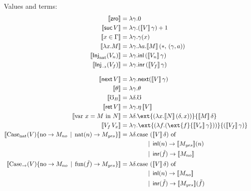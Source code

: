
\noindent Values and terms:
\begin{align*}
  \sem{\zro}         &= \lambda \gamma . 0 \\
  \sem{\suc\, V}     &= \lambda \gamma . (\sem{V}\, \gamma) + 1 \\
  \sem{x \in \Gamma} &= \lambda \gamma . \gamma(x) \\
  \sem{\lda{x}{M}}   &= \lambda \gamma . \lambda a . \sem{M}\, (*,\, (\gamma , a))  \\
  \sem{\injnat{V_n}} &= \lambda \gamma . \inl\, (\sem{V_n}\, \gamma) \\
  \sem{\injarr{V_f}} &= \lambda \gamma . \inr\, (\sem{V_f}\, \gamma) \\[2ex]
  \sem{\nxt\, V}     &= \lambda \gamma . \nxt (\sem{V}\, \gamma) \\
  \sem{\theta}       &= \lambda \gamma . \theta \\
%
  \sem{\err_B}         &= \lambda \delta . \mho \\
  \sem{\ret\, V}       &= \lambda \gamma . \eta\, \sem{V} \\
  \sem{\bind{x}{M}{N}} &= \lambda \delta . \ext {(\lambda x . \sem{N}\, (\delta, x))} {\sem{M}\, \delta} \\
  \sem{V_f\, V_x}      &= \lambda \gamma . \ext {(\lambda f . (\ext {f} {\sem{V_x}\, \gamma}))} {(\sem{V_f}\, \gamma)} \\
  \sem{\casenat{V}{M_{no}}{n}{M_{yes}}}         &= 
    \lambda \delta . \text{case $(\sem{V}\, \delta)$ of} \\ 
    &\quad\quad\quad\quad \alt \inl(n) \to \sem{M_{yes}}(n) \\
    &\quad\quad\quad\quad \alt \inr(\tilde{f}) \to \sem{M_{no}} \\
  \sem{\casearr{V}{M_{no}}{\tilde{f}}{M_{yes}}} &= 
    \lambda \delta . \text{case $(\sem{V}\, \delta)$ of} \\ 
    &\quad\quad\quad\quad \alt \inl(n) \to \sem{M_{no}} \\
    &\quad\quad\quad\quad \alt \inr(\tilde{f}) \to \sem{M_{yes}}(\tilde{f})
\end{align*}



